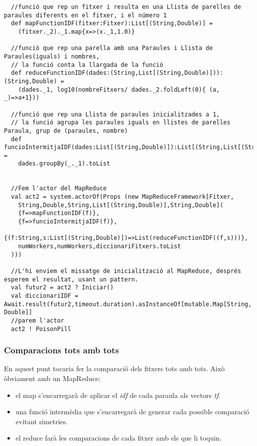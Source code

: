 \documentclass[11pt,a4paper,twoside]{report}
\begin{document}
\begin{lstlisting}
  //funció que rep un fitxer i resulta en una Llista de parelles de paraules diferents en el fitxer, i el número 1
  def mapFunctionIDF(fitxer:Fitxer):List[(String,Double)] =
    (fitxer._2)._1.map{x=>(x._1,1.0)}

  //funció que rep una parella amb una Paraules i Llista de Paraules(iguals) i nombres,
  // la funció conta la llargada de la funció
  def reduceFunctionIDF(dades:(String,List[(String,Double)])):(String,Double) =
    (dades._1, log10(nombreFitxers/ dades._2.foldLeft(0){ (a, _)=>a+1}))

  //funció que rep una Llista de paraules inicialitzades a 1,
  // la funció agrupa les paraules iguals en llistes de parelles Paraula, grup de (paraules, nombre)
  def funcioIntermitjaIDF(dades:List[(String,Double)]):List[(String,List[(String,Double)])] =
    dades.groupBy(_._1).toList


  //Fem l'actor del MapReduce
  val act2 = system.actorOf(Props (new MapReduceFramework[Fitxer,
    String,Double,String,List[(String,Double)],String,Double](
    {f=>mapFunctionIDF(f)},
    {f=>funcioIntermitjaIDF(f)},
    {(f:String,s:List[(String,Double)])=>List(reduceFunctionIDF((f,s)))},
    numWorkers,numWorkers,diccionariFitxers.toList
  )))

  //L'hi enviem el missatge de inicialització al MapReduce, després esperem el resultat, usant un pattern.
  val futur2 = act2 ? Iniciar()
  val diccionariIDF = Await.result(futur2,timeout.duration).asInstanceOf[mutable.Map[String, Double]]
  //parem l'actor
  act2 ! PoisonPill
\end{lstlisting}

\subsubsection{Comparacions tots amb tots}

En aquest punt tocaria fer la comparació dels fitxers tots amb tots. Això òbviament amb un MapReduce:
\begin{itemize}
  \item el map s'encarregarà de aplicar el \textit{idf} de cada paraula als vectors \textit{tf}.
  \item una funció intermèdia que s'encarregarà de generar cada possible comparació evitant simetries.
  \item el reduce farà les comparacions de cada fitxer amb els que li toquin.
\end{itemize}
\end{document}
